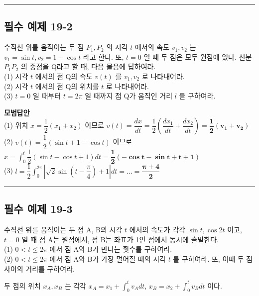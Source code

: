 \documentclass[a4paper,11pt]{article}
\begin{document}
\vspace{0.5cm}
\hrule
\vspace{0.5cm}

\subsection*{필수 예제 19-2}
수직선 위를 움직이는 두 점 $P_1, P_2$ 의 시각 $t$ 에서의 속도 $v_1, v_2$ 는 $v_1 = \sin t, v_2 = 1 - \cos t$ 라고 한다. 또, $t=0$ 일 때 두 점은 모두 원점에 있다. 선분 $P_1P_2$ 의 중점을 Q라고 할 때, 다음 물음에 답하여라.\\
(1) 시각 $t$ 에서의 점 Q의 속도 $v(t)$ 를 $v_1, v_2$ 로 나타내어라.\\
(2) 시각 $t$ 에서의 점 Q의 위치를 $t$ 로 나타내어라.\\
(3) $t=0$ 일 때부터 $t=2\pi$ 일 때까지 점 Q가 움직인 거리 $l$ 을 구하여라.

\textbf{모범답안} \\
(1) 위치 $x = \dfrac{1}{2}(x_1 + x_2)$ 이므로 $v(t) = \dfrac{dx}{dt} = \dfrac{1}{2}(\dfrac{dx_1}{dt} + \dfrac{dx_2}{dt}) = \mathbf{\dfrac{1}{2}(v_1 + v_2)}$ \\
(2) $v(t) = \dfrac{1}{2}(\sin t + 1 - \cos t)$ 이므로 $x = \int_{0}^{t} \dfrac{1}{2}(\sin t - \cos t + 1) dt = \mathbf{\dfrac{1}{2}(-\cos t - \sin t + t + 1)}$ \\
(3) $l = \dfrac{1}{2} \int_{0}^{2\pi} |\sqrt{2}\sin(t - \dfrac{\pi}{4}) + 1| dt = \dots = \mathbf{\dfrac{\pi+4}{2}}$

\vspace{0.5cm}
\hrule
\vspace{0.5cm}

\subsection*{필수 예제 19-3}
수직선 위를 움직이는 두 점 A, B의 시각 $t$ 에서의 속도가 각각 $\sin t, \cos 2t$ 이고, $t=0$ 일 때 점 A는 원점에서, 점 B는 좌표가 1인 점에서 동시에 출발한다.\\
(1) $0 < t \le 2\pi$ 에서 점 A와 B가 만나는 횟수를 구하여라.\\
(2) $0 < t \le 2\pi$ 에서 점 A와 B가 가장 멀어질 때의 시각 $t$ 를 구하여라. 또, 이때 두 점 사이의 거리를 구하여라.

\begin{studybox}
두 점의 위치 $x_A, x_B$ 는 각각 $x_A = x_1 + \int_{0}^{t} v_A dt$, $x_B = x_2 + \int_{0}^{t} v_B dt$ 이다.
\end{studybox}
\end{document}
